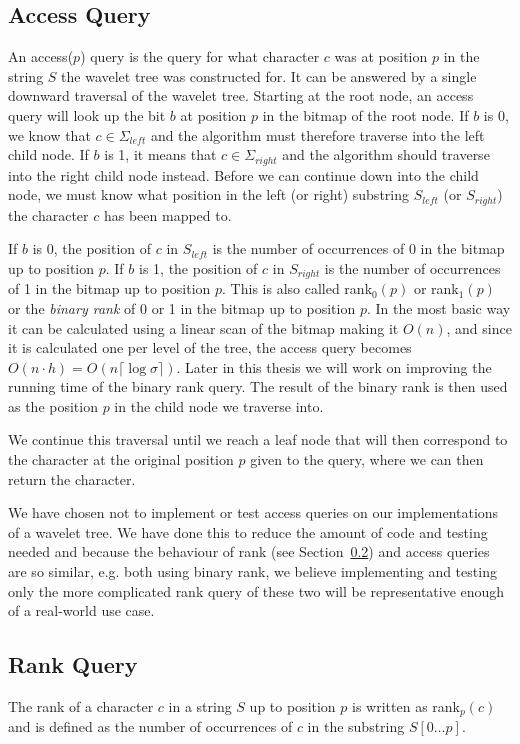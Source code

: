 \subsection{Access Query}
An access($p$) query is the query for what character $c$ was at position $p$ in the string $S$ the wavelet tree was constructed for.
It can be answered by a single downward traversal of the wavelet tree.
Starting at the root node, an access query will look up the bit $b$ at position $p$ in the bitmap of the root node.
If $b$ is 0, we know that $c \in \Sigma_{left}$ and the algorithm must therefore traverse into the left child node.
If $b$ is 1, it means that $c \in \Sigma_{right}$ and the algorithm should traverse into the right child node instead.
Before we can continue down into the child node, we must know what position in the left (or right) substring $S_{left}$ (or $S_{right}$) the character $c$ has been mapped to.

If $b$ is 0, the position of $c$ in $S_{left}$ is the number of occurrences of 0 in the bitmap up to position $p$.
If $b$ is 1, the position of $c$ in $S_{right}$ is the number of occurrences of 1 in the bitmap up to position $p$.
This is also called rank$_0(p)$ or rank$_1(p)$ or the \textit{binary rank} of 0 or 1 in the bitmap up to position $p$.
In the most basic way it can be calculated using a linear scan of the bitmap making it $O(n)$, and since it is calculated one per level of the tree, the access query becomes $O(n \cdot h) = O(n \lceil \log \sigma \rceil)$.
Later in this thesis we will work on improving the running time of the binary rank query.
The result of the binary rank is then used as the position $p$ in the child node we traverse into.

We continue this traversal until we reach a leaf node that will then correspond to the character at the original position $p$ given to the query, where we can then return the character.

We have chosen not to implement or test access queries on our implementations of a wavelet tree.
We have done this to reduce the amount of code and testing needed and because the behaviour of rank (see Section~\ref{sec:rankDescription}) and access queries are so similar, e.g. both using binary rank, we believe implementing and testing only the more complicated rank query of these two will be representative enough of a real-world use case.

\subsection{Rank Query}
\label{sec:rankDescription}
The rank of a character $c$ in a string $S$ up to position $p$ is written as rank$_{p}(c)$ and is defined as the number of occurrences of $c$ in the substring $S[0 \ldots p]$.

